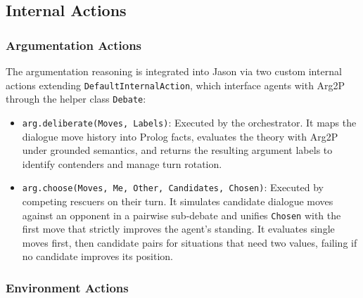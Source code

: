 \subsection{Internal Actions}\label{subsec:impl_internal_actions}

\subsubsection{Argumentation Actions}\label{subsubsec:impl_arg_actions}

The argumentation reasoning is integrated into Jason via two custom internal actions extending \texttt{DefaultInternalAction}, which interface agents with Arg2P through the helper class \texttt{Debate}:
\begin{itemize}
    \item \texttt{arg.deliberate(Moves, Labels)}: Executed by the orchestrator. It maps the dialogue move history into Prolog facts, evaluates the theory with Arg2P under grounded semantics, and returns the resulting argument labels to identify contenders and manage turn rotation.
    \item \texttt{arg.choose(Moves, Me, Other, Candidates, Chosen)}: Executed by competing rescuers on their turn. It simulates candidate dialogue moves against an opponent in a pairwise sub-debate and unifies \texttt{Chosen} with the first move that strictly improves the agent's standing. It evaluates single moves first, then candidate pairs for situations that need two values, failing if no candidate improves its position.
\end{itemize}

\subsubsection{Environment Actions}\label{subsubsec:impl_env_actions}

